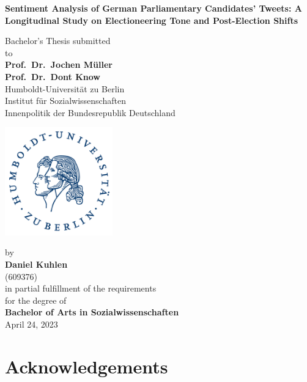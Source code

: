 \documentclass[a4paper,11pt]{article}
\begin{document}
\thispagestyle{empty}
\begin{center}
  {\Large{\bf Sentiment Analysis of German Parliamentary Candidates' Tweets:
A Longitudinal Study on Electioneering Tone and Post-Election Shifts}} \vspace{0.5cm}

  Bachelor's Thesis submitted \\\vspace{0.5cm}
  to \\\vspace{0.5cm}
  \textbf{Prof.~Dr.~Jochen Müller} \\
  \textbf{Prof.~Dr.~Dont Know} \\\vspace{0.5cm}
  Humboldt-Universität zu Berlin \\
  Institut für Sozialwissenschaften \\
  Innenpolitik der Bundesrepublik Deutschland \\
   \vspace{1cm}

  \includegraphics[width=0.35\textwidth]{HU_Logo_small.png}
  
  by \\\vspace{0.5cm}
  \textbf{Daniel Kuhlen} \\
  (609376) \\
  
  \medskip
  \medskip
  in partial fulfillment of the requirements \\
  for the degree of \\
  \textbf{Bachelor of Arts in Sozialwissenschaften} \\\vspace{0.5cm}
  April 24, 2023
  
\end{center}
\newpage
\hypertarget{acknowledgements}{%
\section*{Acknowledgements}\label{acknowledgements}}
\end{document}
